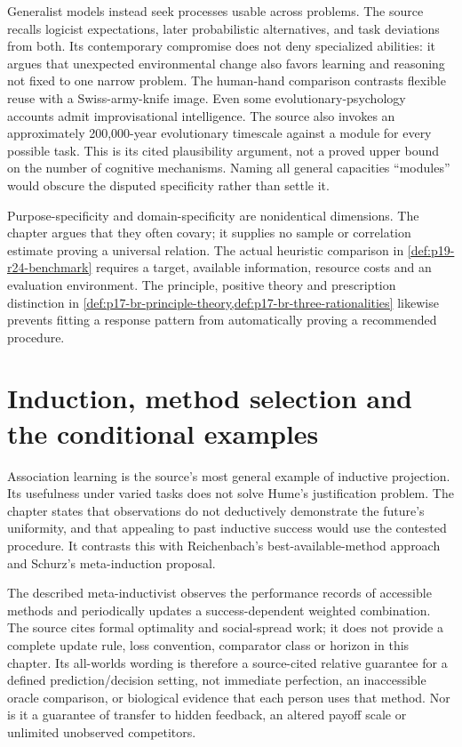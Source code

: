 Generalist models instead seek processes usable across problems. The source
recalls logicist expectations, later probabilistic alternatives, and task
deviations from both. Its contemporary compromise does not deny specialized
abilities: it argues that unexpected environmental change also favors
learning and reasoning not fixed to one narrow problem. The human-hand
comparison contrasts flexible reuse with a Swiss-army-knife image. Even
some evolutionary-psychology accounts admit improvisational intelligence.
The source also invokes an approximately 200,000-year evolutionary timescale
against a module for every possible task. This is its cited plausibility
argument, not a proved upper bound on the number of cognitive mechanisms.
Naming all general capacities ``modules'' would obscure the disputed
specificity rather than settle it.

Purpose-specificity and domain-specificity are nonidentical dimensions.
The chapter argues that they often covary; it supplies no sample or
correlation estimate proving a universal relation. The actual heuristic
comparison in \cref{def:p19-r24-benchmark} requires a target, available
information, resource costs and an evaluation environment. The principle,
positive theory and prescription distinction in
\cref{def:p17-br-principle-theory,def:p17-br-three-rationalities}
likewise prevents fitting a response pattern from automatically proving
a recommended procedure.

\section{Induction, method selection and the conditional examples}
\label{sec:p19-r13-inference}

Association learning is the source's most general example of inductive
projection. Its usefulness under varied tasks does not solve Hume's
justification problem. The chapter states that observations do not
deductively demonstrate the future's uniformity, and that appealing to
past inductive success would use the contested procedure. It contrasts
this with Reichenbach's best-available-method approach and Schurz's
meta-induction proposal.

The described meta-inductivist observes the performance records of accessible
methods and periodically updates a success-dependent weighted combination.
The source cites formal optimality and social-spread work; it does not
provide a complete update rule, loss convention, comparator class or horizon
in this chapter. Its all-worlds wording is therefore a source-cited relative
guarantee for a defined prediction/decision setting, not immediate
perfection, an inaccessible oracle comparison, or biological evidence that
each person uses that method. Nor is it a guarantee of transfer to hidden
feedback, an altered payoff scale or unlimited unobserved competitors.

